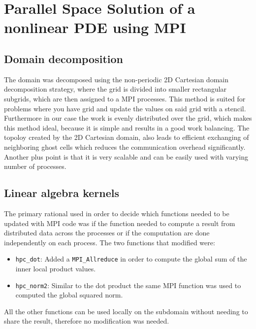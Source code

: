 \section{Parallel Space Solution of a nonlinear PDE using MPI}
\subsection{Domain decomposition}
The domain was decomposed using the non-periodic 2D Cartesian domain decomposition strategy, where the grid is divided into smaller rectangular subgrids, which are then assigned to a MPI processes. This method is suited for problems where you have grid and update the values on said grid with a stencil. Furthermore in our case the work is evenly distributed over the grid, which makes this method ideal, because it is simple and results in a good work balancing.
The topoloy created by the 2D Cartesian domain, also leads to efficient exchanging of neighboring ghost cells which reduces the communication overhead significantly.
Another plus point is that it is very scalable and can be easily used with varying number of processes.


\subsection{Linear algebra kernels}
The primary rational used in order to decide which functions needed to be updated with MPI code was if the function needed to compute a result from distributed data across the processes or if the computation are done independently on each process. The two functions that modified were:
\begin{itemize}
	\item \texttt{hpc\_dot}: Added a \texttt{MPI\_Allreduce} in order to compute the global sum of the inner local product values.
	\item \texttt{hpc\_norm2}: Similar to the dot product the same MPI function was used to computed the global squared norm.
\end{itemize}
All the other functions can be used locally on the subdomain without needing to share the result, therefore no modification was needed.

